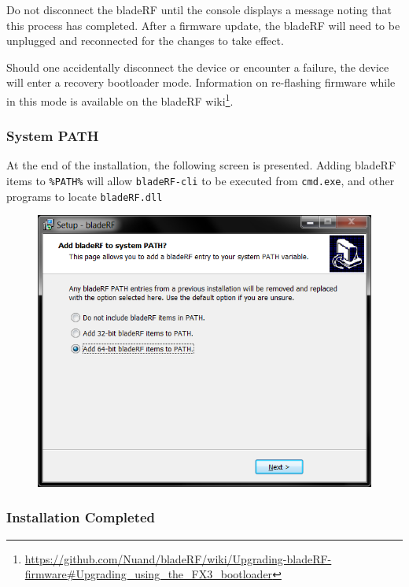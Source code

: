 {Do not disconnect the bladeRF until the console displays a message
noting that this process has completed. After a firmware update, the bladeRF
will need to be unplugged and reconnected for the changes to take effect.

Should one accidentally disconnect the device or encounter a failure, the
device will enter a recovery bootloader mode. Information on re-flashing
firmware while in this mode is available on the bladeRF wiki\footnote{\url{https://github.com/Nuand/bladeRF/wiki/Upgrading-bladeRF-firmware\#Upgrading\_using\_the\_FX3\_bootloader}}.

\newpage
\subsubsection{System PATH}

At the end of the installation, the following screen is presented.
Adding bladeRF items to \texttt{\%PATH\%} will allow \texttt{bladeRF-cli}
to be executed from \texttt{cmd.exe}, and other programs to locate \texttt{bladeRF.dll}

\begin{figure}[h]
  \centering
  \includegraphics{images/windows/installer/10-systempath.png}
\end{figure}


\newpage
\subsubsection{Installation Completed}

}
